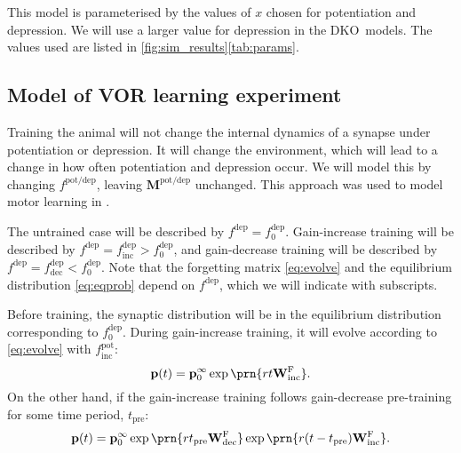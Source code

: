 \documentclass[10pt]{article}
\newcommand{\pr}{\mathbf{p}}
\newcommand{\eq}{\pr^\infty}
\newcommand{\W}{\mathbf{W}}
\newcommand{\frg}{\W^\mathrm{F}}
\newcommand{\M}{\mathbf{M}}
\newcommand{\pot}{^{\text{pot}}}
\newcommand{\dep}{^{\text{dep}}}
\newcommand{\potdep}{^{\text{pot/dep}}}
\newcommand{\norm}{_0}
\newcommand{\inc}{_{\text{inc}}}
\newcommand{\dec}{_{\text{dec}}}
\newcommand{\KO}{DKO}
\newcommand{\tpre}{t_{\text{pre}}}
\begin{document}
This model is parameterised by the values of $x$ chosen for potentiation and depression.
We will use a larger value for depression in the \KO\ models.
The values used are listed in \autoref{fig:sim_results}\ref{tab:params}.








\subsection{Model of VOR learning experiment}\label{sec:learning}

Training the animal will not change the internal dynamics of a synapse under potentiation or depression.
It will change the environment, which will lead to a change in how often potentiation and depression occur.
We will model this by changing $f\potdep$, leaving $\M\potdep$ unchanged.
This approach was used to model motor learning in \cite{Smith2006savings}.

The untrained case will be described by $f\dep=f\dep\norm$.
Gain-increase training  will be described by $f\dep=f\dep\inc>f\dep\norm$, and
gain-decrease training  will be described by $f\dep=f\dep\dec<f\dep\norm$.
Note that the forgetting matrix \eqref{eq:evolve} and the equilibrium distribution \eqref{eq:eqprob} depend on $f\dep$, which we will indicate with subscripts.

Before training, the synaptic distribution will be in the equilibrium distribution corresponding to $f\dep\norm$.
During gain-increase training, it will evolve according to \eqref{eq:evolve} with $f\pot\inc$:
%
\begin{equation}\label{eq:nopre}
  \pr(t) = \eq\norm \exp\prn{rt\frg\inc}.
\end{equation}
%
On the other hand, if the gain-increase training follows gain-decrease pre-training for some time period, $\tpre$:
%
\begin{equation}\label{eq:withpre}
  \pr(t) = \eq\norm \exp\prn{r\tpre\frg\dec} \exp\prn{r(t-\tpre)\frg\inc}.
\end{equation}
%
\end{document}
